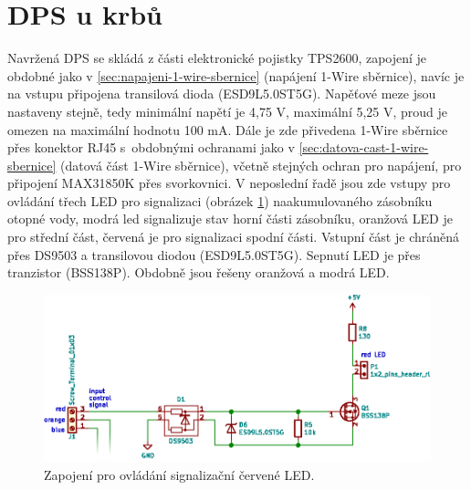 \section{DPS u krbů}
Navržená DPS se skládá z části elektronické pojistky TPS2600, zapojení je obdobné jako v \ref{sec:napajeni-1-wire-sbernice} (napájení 1-Wire sběrnice), navíc je na vstupu připojena transilová dioda (ESD9L5.0ST5G). Napěťové meze jsou nastaveny stejně, tedy minimální napětí je 4,75 V, maximální 5,25 V, proud je omezen na maximální hodnotu 100 mA. Dále je zde přivedena 1-Wire sběrnice přes konektor RJ45 s~obdobnými ochranami jako v \ref{sec:datova-cast-1-wire-sbernice} (datová část 1-Wire sběrnice), včetně stejných ochran pro napájení, pro připojení MAX31850K přes svorkovnici. V neposlední řadě jsou zde vstupy pro ovládání třech LED pro signalizaci (obrázek \ref{fig:ochrana-krby-lcd-teplotni-senzor}) naakumulovaného zásobníku otopné vody, modrá led signalizuje stav horní části zásobníku, oranžová LED je pro střední část, červená je pro signalizaci spodní části. Vstupní část je chráněná přes DS9503 a transilovou diodou (ESD9L5.0ST5G). Sepnutí LED je přes tranzistor (BSS138P). Obdobně jsou řešeny oranžová a modrá LED.

\begin{figure}[H]
    \centering
    \includegraphics[width=\textwidth]{images/svg/kicad/ochrana-krby-lcd-teplotni-senzor.eps}
    \caption[Zapojení pro ovládání signalizační červené LED.]{Zapojení pro ovládání signalizační červené LED.}
    \label{fig:ochrana-krby-lcd-teplotni-senzor}
\end{figure}


